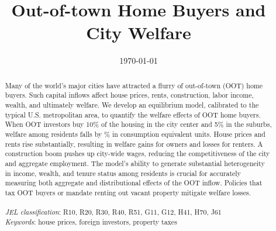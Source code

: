 \documentclass[letterpaper,12pt,dvipsnames,usenames]{article}
\theoremstyle{definition}
\begin{document}
\title{\textbf{Out-of-town Home Buyers and City Welfare}}


\date{\today}
\maketitle

\vspace{-1cm}

\begin{abstract}
\singlespacing
Many of the world's  major cities have attracted a flurry of out-of-town (OOT) home buyers. Such capital inflows affect house prices, rents, construction, labor income, wealth, and ultimately welfare. We develop an equilibrium model, calibrated to the typical U.S. metropolitan area, to quantify the welfare effects of OOT home buyers. When OOT investors buy 10\% of the housing in the city center and 5\% in the suburbs, welfare among residents falls by \% in consumption equivalent units. House prices and rents rise substantially, resulting in welfare gains for owners and losses for renters. A construction boom pushes up city-wide wages, reducing the competitiveness of the city and aggregate employment. The model's ability to generate substantial heterogeneity in income, wealth, and tenure status among residents is crucial for accurately measuring both aggregate and distributional effects of the OOT inflow. Policies that tax OOT buyers or mandate renting out vacant property mitigate welfare losses.
\\ \\
\emph{JEL classification}: R10, R20, R30, R40, R51, G11, G12, H41, H70, J61 \\
\emph{Keywords}:  house prices, foreign investors,  property taxes
\end{abstract}

\thispagestyle{empty}

\newpage
\end{document}

